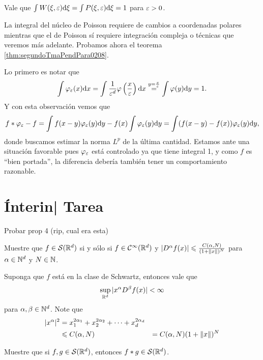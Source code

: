 \documentclass[12pt]{memoir}
\begin{document}
\begin{Lem}
  Vale que $\int W(\xi,\varepsilon)\dd\xi=\int P(\xi,\varepsilon)\dd\xi=1$ para $\varepsilon>0$.
\end{Lem}

La integral del núcleo de Poisson requiere de cambios a coordenadas polares mientras que el de Poisson sí requiere integración compleja o técnicas que veremos más adelante. Probamos ahora el teorema \ref{thm:segundoTmaPendPara0208}.

\begin{ptcbp}
  Lo primero es notar que 
  $$\int\varphi_\varepsilon(x)\dd x=\int\frac{1}{\varepsilon^d}\varphi\left(\frac{x}{\varepsilon}\right)\dd x\stackrel{y=\frac{x}{\varepsilon}}{=}\int\varphi(y)\dd y=1.$$
  Y con esta observación vemos que 
  $$f\ast\varphi_\varepsilon-f=\int f(x-y)\varphi_\varepsilon(y)\dd y-f(x)\int\varphi_\varepsilon(y)\dd y=\int(f(x-y)-f(x))\varphi_\varepsilon(y)\dd y,$$
  donde buscamos estimar la norma $L^p$ de la última cantidad. Estamos ante una situación favorable pues $\varphi_\varepsilon$ está controlado ya que tiene integral 1, y como $f$ es ``bien portada'', la diferencia debería también tener un comportamiento razonable. 
\end{ptcbp}


\section{Ínterin| Tarea}

\begin{Ej}
  Probar prop 4 (rip, cual era esta)
  \end{Ej}

\begin{Ej}
 Muestre que $f\in\mathcal{S}(\mathbb{R}^d)$ si y sólo si $f\in\mathcal{C}^\infty(\mathbb{R}^d)$ y $|D^\alpha f(x)|\leqslant \frac{C(\alpha,N)}{(1+\left\|x\right\|)^N}$ para $\alpha\in\mathbb{N}^d$ y $N\in\mathbb{N}$.
\end{Ej}

\begin{ptcbp}%
  Suponga que $f$ está en la clase de Schwartz, entonces vale que 
  $$\sup_{\mathbb{R}^d}|x^\alpha D^\beta f(x)|<\infty$$
  para $\alpha,\beta\in\mathbb{N}^d$. Note que 
  \begin{align*}
    |x^\alpha|^2&=x_1^{2\alpha_1}+x_2^{2\alpha_2}+\dots+x_d^{2\alpha_d}\\
    &\leqslant C(\alpha,N)
    &= C(\alpha,N)(1+\left\|x\right\|)^N
  \end{align*}
\end{ptcbp}

\begin{Ej}
  Muestre que si $f,g\in\mathcal{S}(\mathbb{R}^d)$, entonces $f\ast g\in\mathcal{S}(\mathbb{R}^d)$.
 \end{Ej}

 \begin{ptcbp}%
   
 \end{ptcbp}
\ifx\nextra\undefined
\printindex
\else\fi
\nocite{*}


\end{document}
